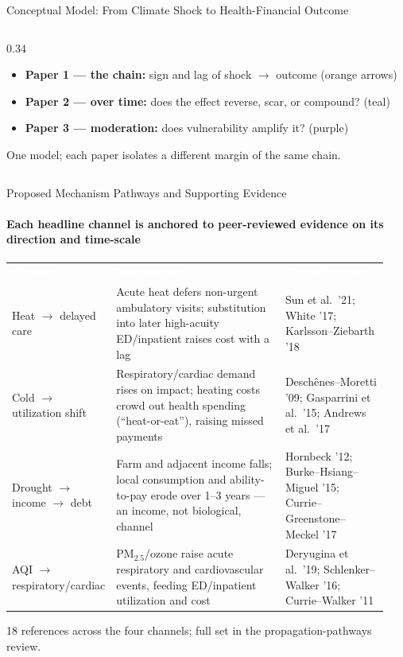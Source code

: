 \documentclass[aspectratio=169,11pt]{beamer}
\newcommand{\graytext}[1]{{\color{WarmGray}#1}}
\newcommand{\purpletext}[1]{{\color{SoftPurple}#1}}
\begin{document}
\begin{frame}{Conceptual Model: From Climate Shock to Health-Financial Outcome}
\begin{columns}[T]
\begin{column}{0.34\textwidth}
\begin{itemize}
        \item \textbf{Paper 1 --- the chain:} sign and lag of shock \(\to\) outcome \graytext{(orange arrows)}
        \item \textbf{Paper 2 --- over time:} does the effect reverse, scar, or compound? \graytext{(teal)}
        \item \textbf{Paper 3 --- moderation:} does \purpletext{vulnerability} amplify it? \graytext{(purple)}
      \end{itemize}
      \vspace{0.2em}
      \graytext{\scriptsize One model; each paper isolates a different margin of the same chain.}
    \end{column}
  \end{columns}
\end{frame}

\begin{frame}{Proposed Mechanism Pathways and Supporting Evidence}
  \framesubtitle{Each headline channel is anchored to peer-reviewed evidence on its direction and time-scale}
  \scriptsize
  \renewcommand{\arraystretch}{1.3}
  \begin{tabular}{@{}>{\raggedright\arraybackslash}p{0.19\linewidth}>{\raggedright\arraybackslash}p{0.46\linewidth}>{\raggedright\arraybackslash}p{0.29\linewidth}@{}}
    \rowcolor{DeepNavy}
    \textcolor{white}{\textbf{Channel}} &
    \textcolor{white}{\textbf{Mechanism}} &
    \textcolor{white}{\textbf{Key references}} \\
    \rowcolor{Teal!10}
    Heat \(\to\) delayed care
      & Acute heat defers non-urgent ambulatory visits; substitution into later high-acuity ED/inpatient raises cost with a lag
      & Sun et al.\ '21; White '17; Karlsson--Ziebarth '18 \\
    Cold \(\to\) utilization shift
      & Respiratory/cardiac demand rises on impact; heating costs crowd out health spending (``heat-or-eat''), raising missed payments
      & Desch\^enes--Moretti '09; Gasparrini et al.\ '15; Andrews et al.\ '17 \\
    \rowcolor{Teal!10}
    Drought \(\to\) income \(\to\) debt
      & Farm and adjacent income falls; local consumption and ability-to-pay erode over 1--3 years --- an income, not biological, channel
      & Hornbeck '12; Burke--Hsiang--Miguel '15; Currie--Greenstone--Meckel '17 \\
    AQI \(\to\) respiratory/cardiac
      & PM\(_{2.5}\)/ozone raise acute respiratory and cardiovascular events, feeding ED/inpatient utilization and cost
      & Deryugina et al.\ '19; Schlenker--Walker '16; Currie--Walker '11 \\
    \bottomrule
  \end{tabular}
  \vspace{0.4em}
  \begin{center}
    \graytext{\scriptsize 18 references across the four channels; full set in the propagation-pathways review.}
  \end{center}
\end{frame}
\end{document}
